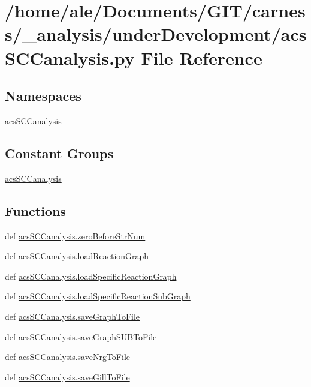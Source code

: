 \hypertarget{a00039}{\section{/home/ale/\-Documents/\-G\-I\-T/carness/\-\_\-analysis/under\-Development/acs\-S\-C\-Canalysis.py File Reference}
\label{a00039}
}
\subsection*{Namespaces}
\begin{DoxyCompactItemize}
\item 
\hyperlink{a00096}{acs\-S\-C\-Canalysis}
\end{DoxyCompactItemize}
\subsection*{Constant Groups}
\begin{DoxyCompactItemize}
\item 
\hyperlink{a00096}{acs\-S\-C\-Canalysis}
\end{DoxyCompactItemize}
\subsection*{Functions}
\begin{DoxyCompactItemize}
\item 
def \hyperlink{a00096_ab46df2a2027edcf1b07fc012b691b9d6}{acs\-S\-C\-Canalysis.\-zero\-Before\-Str\-Num}
\item 
def \hyperlink{a00096_a4c179674ced261fa5a003a679647d7f3}{acs\-S\-C\-Canalysis.\-load\-Reaction\-Graph}
\item 
def \hyperlink{a00096_a7517a12f1c90a0ae0e997161079676bd}{acs\-S\-C\-Canalysis.\-load\-Specific\-Reaction\-Graph}
\item 
def \hyperlink{a00096_ab9d3c9c8514469b4dea42d8caacb3937}{acs\-S\-C\-Canalysis.\-load\-Specific\-Reaction\-Sub\-Graph}
\item 
def \hyperlink{a00096_abf8df0ca8eb1c3ae9aeb0b20813d93d2}{acs\-S\-C\-Canalysis.\-save\-Graph\-To\-File}
\item 
def \hyperlink{a00096_a5c959ea7dd3d2bd42004f1e5fd41f249}{acs\-S\-C\-Canalysis.\-save\-Graph\-S\-U\-B\-To\-File}
\item 
def \hyperlink{a00096_a541e9f38936fdf58fde0869521fdc5fc}{acs\-S\-C\-Canalysis.\-save\-Nrg\-To\-File}
\item 
def \hyperlink{a00096_ae6d4582e548a062fb38bf6aaa62e1558}{acs\-S\-C\-Canalysis.\-save\-Gill\-To\-File}
\end{DoxyCompactItemize}
